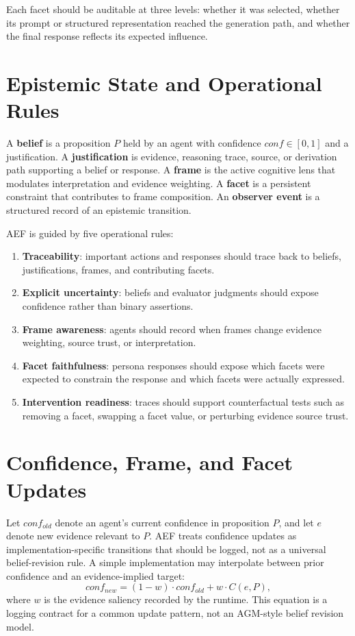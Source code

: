 \documentclass[10pt,a4paper]{article}
\newcommand{\method}{AEF}
\begin{document}
Each facet should be auditable at three levels: whether it was selected, whether its prompt or structured representation reached the generation path, and whether the final response reflects its expected influence.

\section{Epistemic State and Operational Rules}
A \textbf{belief} is a proposition $P$ held by an agent with confidence $conf \in [0,1]$ and a justification. A \textbf{justification} is evidence, reasoning trace, source, or derivation path supporting a belief or response. A \textbf{frame} is the active cognitive lens that modulates interpretation and evidence weighting. A \textbf{facet} is a persistent constraint that contributes to frame composition. An \textbf{observer event} is a structured record of an epistemic transition.

\method{} is guided by five operational rules:
\begin{enumerate}[leftmargin=*]
  \item \textbf{Traceability}: important actions and responses should trace back to beliefs, justifications, frames, and contributing facets.
  \item \textbf{Explicit uncertainty}: beliefs and evaluator judgments should expose confidence rather than binary assertions.
  \item \textbf{Frame awareness}: agents should record when frames change evidence weighting, source trust, or interpretation.
  \item \textbf{Facet faithfulness}: persona responses should expose which facets were expected to constrain the response and which facets were actually expressed.
  \item \textbf{Intervention readiness}: traces should support counterfactual tests such as removing a facet, swapping a facet value, or perturbing evidence source trust.
\end{enumerate}

\section{Confidence, Frame, and Facet Updates}
Let $conf_{old}$ denote an agent's current confidence in proposition $P$, and let $e$ denote new evidence relevant to $P$. \method{} treats confidence updates as implementation-specific transitions that should be logged, not as a universal belief-revision rule. A simple implementation may interpolate between prior confidence and an evidence-implied target:
\begin{equation}
conf_{new} = (1 - w) \cdot conf_{old} + w \cdot C(e,P),
\end{equation}
where $w$ is the evidence saliency recorded by the runtime. This equation is a logging contract for a common update pattern, not an AGM-style belief revision model.
\end{document}
